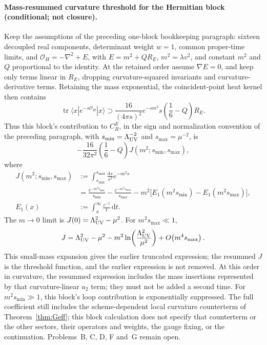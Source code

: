 \paragraph{Mass-resummed curvature threshold for the Hermitian block
(conditional; not closure).}
Keep the assumptions of the preceding one-block bookkeeping paragraph:
sixteen decoupled real components, determinant weight \(w=1\), common
proper-time limits, and
\(\mathcal O_H=-\nabla^2+E\), with
\(E=m^2+Q R_E\), \(m^2=\lambda v^2\), and constant \(m^2\) and \(Q\)
proportional to the identity. At the retained order assume
\(\nabla E=0\), and keep only terms linear in \(R_E\), dropping
curvature-squared invariants and curvature-derivative terms. Retaining
the mass exponential, the coincident-point heat kernel then contains
\[
\operatorname{tr}\langle x|e^{-s\mathcal O_H}|x\rangle
\supset
\frac{16}{(4\pi s)^2}e^{-sm^2}
s\left(\frac16-Q\right)R_E .
\]
Thus this block's contribution to \(C_R^E\), in the sign and
normalization convention of the preceding paragraph, with
\(s_{\min}=\Lambda_{\mathrm{UV}}^{-2}\) and \(s_{\max}=\mu^{-2}\), is
\[
-\frac{16}{32\pi^2}\left(\frac16-Q\right)
J(m^2;s_{\min},s_{\max}),
\]
where
\[
\begin{aligned}
J(m^2;s_{\min},s_{\max})
&:=\int_{s_{\min}}^{s_{\max}}\frac{\mathrm{d}s}{s^2}e^{-m^2s}\\
&=\frac{e^{-m^2s_{\min}}}{s_{\min}}
 -\frac{e^{-m^2s_{\max}}}{s_{\max}}
 -m^2\bigl[
 E_1(m^2s_{\min})-E_1(m^2s_{\max})
 \bigr],
\\
E_1(x)
&:=\int_x^\infty\frac{e^{-t}}{t}\,\mathrm{d}t.
\end{aligned}
\]
The \(m\to0\) limit is \(J(0)=\Lambda_{\mathrm{UV}}^2-\mu^2\). For
\(m^2s_{\max}\ll1\),
\[
J=\Lambda_{\mathrm{UV}}^2-\mu^2
 -m^2\ln\!\left(\frac{\Lambda_{\mathrm{UV}}^2}{\mu^2}\right)
 +O\!\left(m^4s_{\max}\right).
\]
This small-mass expansion gives the earlier truncated expression;
the resummed \(J\) is the threshold function, and the earlier
expression is not removed. At this order in curvature, the resummed
expression includes the mass insertions represented by that
curvature-linear \(a_2\) term; they must not be added a second time.
For \(m^2s_{\min}\gg1\), this block's loop contribution is
exponentially suppressed. The full coefficient still includes the
scheme-dependent local curvature counterterm of
Theorem~\ref{thm:Geff}; this block calculation does not specify that
counterterm or the other sectors, their operators and weights, the
gauge fixing, or the continuation. Problems~B, C, D, F and~G remain
open.
